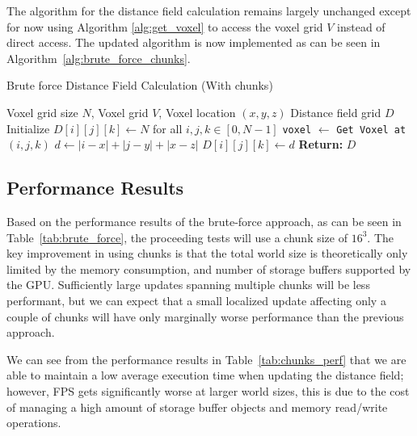The algorithm for the distance field calculation remains largely unchanged except for now using Algorithm
\ref{alg:get_voxel} to access the voxel grid \(V\) instead of direct access. The updated algorithm is now implemented
as can be seen in Algorithm~\ref{alg:brute_force_chunks}.

\begin{algorithm}[H]
    \caption{Brute force Distance Field Calculation (With chunks)}
    \label{alg:brute_force_chunks}
    \begin{algorithmic}[1]
        \REQUIRE Voxel grid size \(N\), Voxel grid \(V\), Voxel location \((x, y, z)\)
        \ENSURE Distance field grid \(D\)
        \STATE Initialize \(D[i][j][k] \gets N\) for all \(i, j, k \in [0, N-1]\)
        \STATE \texttt{voxel} $\gets$ \texttt{Get Voxel at} \((i, j, k)\)
        \STATE \(d \gets |i - x| + |j - y| + |x - z|\)
        \STATE \(D[i][j][k] \gets d\)
        \ENDIF
        \ENDIF
        \ENDFOR
        \ENDFOR
        \ENDFOR
        \STATE \textbf{Return:} \(D\)
    \end{algorithmic}
\end{algorithm}

\subsection{Performance Results}
Based on the performance results of the brute-force approach, as can be seen in Table~\ref{tab:brute_force}, the
proceeding tests will use a chunk size of \(16^3\). The key improvement in using chunks is that the total world size is
theoretically only limited by the memory consumption, and number of storage buffers supported by the GPU. Sufficiently
large updates spanning multiple chunks will be less performant, but we can expect that a small localized update
affecting only a couple of chunks will have only marginally worse performance than the previous approach.

We can see from the performance results in Table~\ref{tab:chunks_perf} that we are able to maintain a low average
execution time when updating the distance field; however, FPS gets significantly worse at larger world sizes, this is
due to the cost of managing a high amount of storage buffer objects and memory read/write operations.

